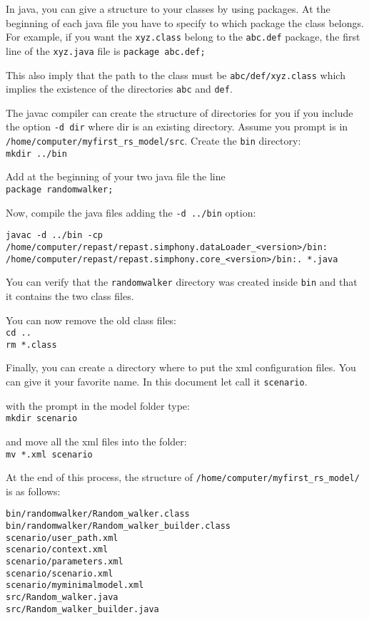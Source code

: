 \documentclass{article}
\begin{document}
In java, you can give a structure to your classes by using packages. At the beginning of each java file you have to specify to which package the class belongs. For example, if you want the \verb+xyz.class+ belong to the \verb+abc.def+ package, the first line of the \verb+xyz.java+ file is \verb+package abc.def;+

This also imply that the path to the class must be \verb+abc/def/xyz.class+ which implies the existence of the directories \verb+abc+ and \verb+def+.

The javac compiler can create the structure of directories for you if you include the option \verb+-d dir+ where dir is an existing directory. Assume you prompt is in \verb+/home/computer/myfirst_rs_model/src+. Create the \verb+bin+ directory:\\
\verb+mkdir ../bin+

Add at the beginning of your two java file the line\\
\verb+package randomwalker;+

Now, compile the java files adding the \verb+-d ../bin+ option:

\begin{verbatim}
javac -d ../bin -cp /home/computer/repast/repast.simphony.dataLoader_<version>/bin:
/home/computer/repast/repast.simphony.core_<version>/bin:. *.java
\end{verbatim}

You can verify that the \verb+randomwalker+ directory was created inside \verb+bin+ and that it contains the two class files.

You can now remove the old class files:\\
\verb+cd ..+\\
\verb+rm *.class+

Finally, you can create a directory where to put the xml configuration files. You can give it your favorite name. In this document let call it \verb+scenario+.

with the prompt in the model folder type:\\
\verb+mkdir scenario+

and move all the xml files into the folder:\\
\verb+mv *.xml scenario+

At the end of this process, the structure of \verb+/home/computer/myfirst_rs_model/+ is as follows:
\begin{verbatim}
bin/randomwalker/Random_walker.class
bin/randomwalker/Random_walker_builder.class
scenario/user_path.xml
scenario/context.xml
scenario/parameters.xml
scenario/scenario.xml
scenario/myminimalmodel.xml
src/Random_walker.java
src/Random_walker_builder.java
\end{verbatim}
\end{document}
